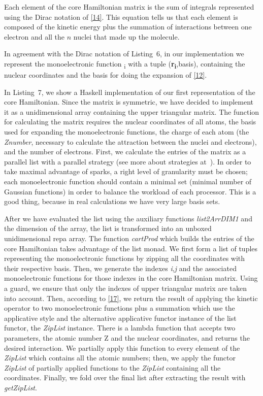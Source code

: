 \documentclass{tmr}
\begin{document}
Each element of the core Hamiltonian matrix is the sum of integrals represented using
the Dirac notation of \eqref{14}. This equation tells us that each element is composed
of the kinetic energy plus the summation of interactions between one electron and all the $n$
nuclei that made up the molecule.

In agreement with the Dirac notation of Listing~6, in our implementation we represent the
monoelectronic function \textchi \textsubscript{i} with a tuple 
(\textbf{r\textsubscript{i}},basis), containing the nuclear coordinates 
and the basis for doing the expansion of \eqref{12}.

In Listing~7, we show a Haskell implementation of our first representation of 
the core Hamiltonian. Since the matrix is symmetric, we have decided to implement it
as a unidimensional array containing the upper triangular matrix.
The function for calculating the matrix requires the nuclear coordinates of all atoms, the basis used
for expanding the monoelectronic functions, the charge of each atom (the \textit{Znumber}, necessary to
calculate the attraction between the nuclei and electrons), and the number of electrons. First, we
calculate the entries of the matrix as a parallel list with a parallel strategy
(see more about strategies at~\cite{strategies}). In order to take maximal advantage
of sparks, a right level of granularity must be chosen;
each monoelectronic function should contain
a minimal set (minimal number of Gaussian functions) in order to balance the workload
of each processor.
This is a good thing, because in real calculations we have very large basis sets.

After we have evaluated the list using the auxiliary functions \textit{list2ArrDIM1}
and the dimension of the array, the list is transformed into an unboxed unidimensional repa array.
The function \textit{cartProd} which builds the entries of the core Hamiltonian
takes advantage of the list monad. We first form a list of tuples representing the monoelectronic
functions by zipping all the coordinates with their respective basis. Then, we generate the
indexes \textit{i},\textit{j} and the associated monoelectronic functions for those 
indexes in the core Hamiltonian matrix. Using a guard, we ensure that only the indexes of
upper triangular matrix are taken into account. Then, according to \eqref{17}, we return
the result of applying the kinetic operator to two monoelectronic functions plus a summation
which use the applicative style and the alternative applicative functor instance of the list functor, the
\textit{ZipList} instance. There is a lambda function that accepts two parameters, the atomic number Z and
the nuclear coordinates, and returns the desired interaction.  We partially apply this function
to every element of the \textit{ZipList} which contains all the atomic numbers; then, we apply the 
functor \textit{ZipList} of partially applied functions to the \textit{ZipList} 
containing all the coordinates. Finally, we fold over the final list after extracting
the result with \textit{getZipList}.
\end{document}
